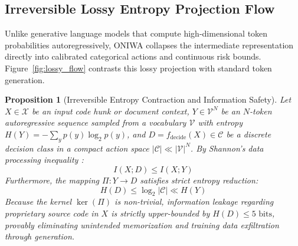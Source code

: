 \documentclass[10pt,twocolumn,letterpaper]{article}
\newtheorem{proposition}{Proposition}
\begin{document}
\subsection{Irreversible Lossy Entropy Projection Flow}
Unlike generative language models that compute high-dimensional token probabilities autoregressively, ONIWA collapses the intermediate representation directly into calibrated categorical actions and continuous risk bounds. Figure~\ref{fig:lossy_flow} contrasts this lossy projection with standard token generation.

\begin{proposition}[Irreversible Entropy Contraction and Information Safety]
Let $X \in \mathcal{X}$ be an input code hunk or document context, $Y \in \mathcal{V}^N$ be an $N$-token autoregressive sequence sampled from a vocabulary $\mathcal{V}$ with entropy $H(Y) = -\sum_{y} p(y) \log_2 p(y)$, and $D = f_{\text{decide}}(X) \in \mathcal{C}$ be a discrete decision class in a compact action space $|\mathcal{C}| \ll |\mathcal{V}|^N$. By Shannon's data processing inequality \cite{shannon1948}:
\begin{equation}
I(X; D) \le I(X; Y)
\end{equation}
Furthermore, the mapping $\Pi: Y \to D$ satisfies strict entropy reduction:
\begin{equation}
H(D) \le \log_2 |\mathcal{C}| \ll H(Y)
\end{equation}
Because the kernel $\ker(\Pi)$ is non-trivial, information leakage regarding proprietary source code in $X$ is strictly upper-bounded by $H(D) \le 5\text{ bits}$, provably eliminating unintended memorization and training data exfiltration through generation.
\end{proposition}
\end{document}
